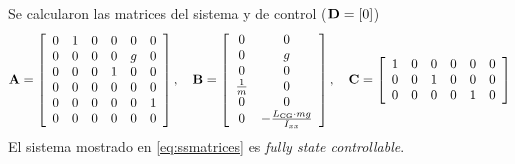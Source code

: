 Se calcularon las matrices del sistema y de control ($\mathbf{D} = [0]$)
\begin{equation} \label{eq:ssmatrices}
	\mathbf{A} = 
	\left[\begin{array}{cccccc} 0 & 1 & 0 & 0 & 0 & 0\\ 0 & 0 & 0 & 0 & g & 0\\ 0 & 0 & 0 & 1 & 0 & 0\\ 0 & 0 & 0 & 0 & 0 & 0\\ 0 & 0 & 0 & 0 & 0 & 1\\ 0 & 0 & 0 & 0 & 0 & 0 \end{array}\right],\quad \mathbf{B} = 
	\left[\begin{array}{cc} 0 & 0\\ 0 & g\\ 0 & 0\\ \frac{1}{m} & 0\\ 0 & 0\\ 0 & -\frac{L_{\mathrm{CG}} \cdot mg}{I_{xx}} \end{array}\right], \quad \mathbf{C} =  \left[\begin{array}{cccccc} 1 & 0 & 0 & 0 & 0 & 0\\ 0 & 0 & 1 & 0 & 0 & 0\\ 0 & 0 & 0 & 0 & 1 & 0 \end{array}\right]
\end{equation}
El sistema mostrado en \eqref{eq:ssmatrices} es \textit{fully state controllable}.
